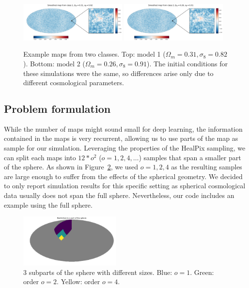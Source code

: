 \documentclass[final,twocolumn,3p,times,authoryear]{elsarticle}
\newcommand{\nati}[1]{{\color[rgb]{.1,.6,.1}{#1}}}
\newcommand{\figref}[1]{Figure~\ref{fig:#1}}
\newcommand{\1}{\b{1}}              %
\newcommand{\0}{\b{0}}              %
\begin{document}
\begin{figure}[!ht]
\centering
\includegraphics[width=0.48\textwidth]{figures/smooth_map_class_1.pdf}
\includegraphics[width=0.48\textwidth]{figures/smooth_map_class_2.pdf}
\caption{Example maps from two classes. Top: model 1 ($\Omega_m=0.31, \sigma_8=0.82$). Bottom: model 2 ($\Omega_m=0.26, \sigma_8=0.91$).
The initial conditions for these simulations were the same, so differences arise only due to different cosmological parameters. \nati{Tomek: Is this correct?}}
\label{fig:map_sample}
\end{figure}



\subsection{Problem formulation}
While the number of maps might sound small for deep learning, the information contained in the maps is very recurrent, allowing us to use parts of the map as sample for our simulation.
Leveraging the properties of the HealPix sampling, we can split each maps
into $12*o^2$ ($o=1,2,4,\dots$) samples that span a smaller part of the sphere. 
As shown in \figref{subpart_sphere}, we used $o=1,2,4$ as the resulting
samples are large enough to suffer from the effects of the spherical geometry. We
decided to only report simulation results for this specific setting as spherical
cosmological data usually does not span the full sphere. Nevertheless, our code
includes an example using the full sphere.

\begin{figure}[!ht]
\centering
\includegraphics[width=0.45\textwidth]{figures/part_sphere.pdf}
\caption{3 subparts of the sphere with different sizes. Blue: $o=1$. Green: order $o=2$. Yellow: order $o=4$.}
\label{fig:subpart_sphere}
\end{figure}
\end{document}

